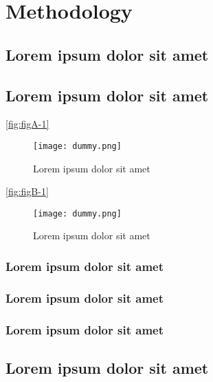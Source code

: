 \chapter{Methodology}

\section{Lorem ipsum dolor sit amet}

\lipsum[1-3]

\section{Lorem ipsum dolor sit amet}

\lipsum[1-1] \ref{fig:figA-1}

\begin{figure}[H]
    \centering
    \texttt{[image: dummy.png]}
    \caption{Lorem ipsum dolor sit amet}
    \label{fig:figA-3}
\end{figure}

\lipsum[1-1] \ref{fig:figB-1}

\begin{figure}[H]
    \centering
    \texttt{[image: dummy.png]}
    \caption{Lorem ipsum dolor sit amet}
    \label{fig:figB-3}
\end{figure}

\subsection{Lorem ipsum dolor sit amet}

\lipsum[1-1] \cite{reference-1}

\subsection{Lorem ipsum dolor sit amet}

\lipsum[1-1] \cite{reference-2}

\subsection{Lorem ipsum dolor sit amet}

\lipsum[1-1] \cite{reference-3}

\section{Lorem ipsum dolor sit amet}

